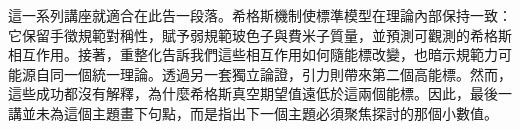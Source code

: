 \begin{classroomqa}
\end{classroomqa}

\begin{classroomqa}
\end{classroomqa}

這一系列講座就適合在此告一段落。希格斯機制使標準模型在理論內部保持一致：它保留手徵規範對稱性，賦予弱規範玻色子與費米子質量，並預測可觀測的希格斯相互作用。接著，重整化告訴我們這些相互作用如何隨能標改變，也暗示規範力可能源自同一個統一理論。透過另一套獨立論證，引力則帶來第二個高能標。然而，這些成功都沒有解釋，為什麼希格斯真空期望值遠低於這兩個能標。因此，最後一講並未為這個主題畫下句點，而是指出下一個主題必須聚焦探討的那個小數值。